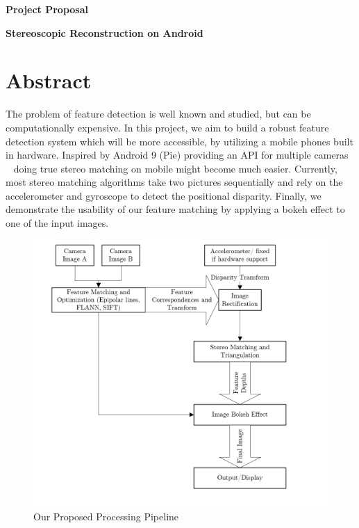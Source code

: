 \documentclass[a4paper,pagesize 10pt]{scrartcl}
\begin{document}
\begin{center}{\Huge\textbf{Project Proposal}}\end{center}

\begin{center}{\Large\textbf{Stereoscopic Reconstruction on Android}}\end{center}


\section{Abstract}

%
%
%
%
%
The problem of feature detection is well known and studied, but can be computationally expensive. In this project, we aim to build a robust feature detection system which will be more accessible, by utilizing a mobile phones built in hardware. Inspired by Android 9 (Pie)
providing an API for multiple cameras ~\cite{AndroidPMultiCamera} doing true stereo matching on mobile might become much easier. Currently, most stereo matching algorithms take two pictures sequentially and rely on the accelerometer and gyroscope to detect the positional disparity. Finally, we demonstrate the usability of our feature matching by applying a bokeh effect to one of the input images.
\begin{figure}[h]
	\centering
	\includegraphics[scale=0.55]{Pipeline.PNG}
	\caption{Our Proposed Processing Pipeline}
\end{figure}
\end{document}
